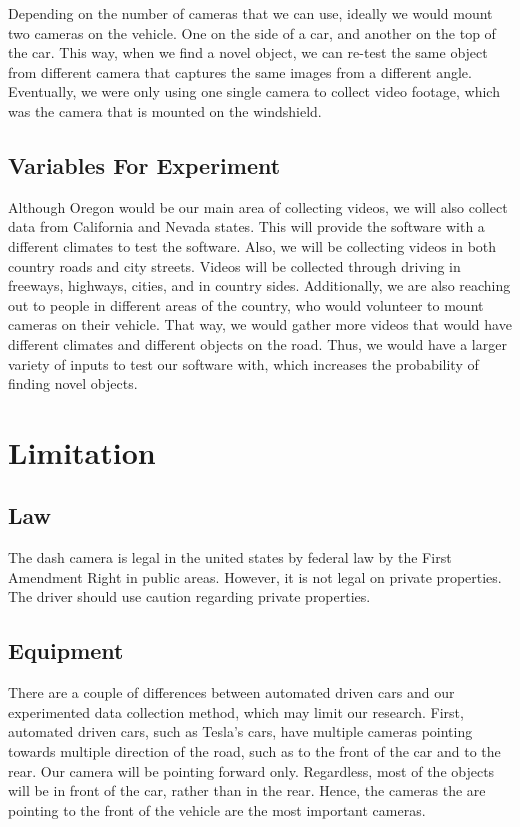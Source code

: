 \documentclass[10pt,draftclsnofoot,onecolumn,journal,compsoc]{IEEEtran}
\begin{document}
Depending on the number of cameras that we can use, ideally we would mount two cameras on the vehicle. One on the side of a car, and another on the top of the car. This way, when we find a novel object, we can re-test the same object from different camera that captures the same images from a different angle.\\

Eventually, we were only using one single camera to collect video footage, which was the camera that is mounted on the windshield. 


\subsection{Variables For Experiment}
Although Oregon would be our main area of collecting videos, we will also collect data from California and Nevada states. This will provide the software with a different climates to test the software. Also, we will be collecting videos in both country roads and city streets. Videos will be collected through driving in freeways, highways, cities, and in country sides. Additionally, we are also reaching out to people in different areas of the country, who would volunteer to mount cameras on their vehicle. That way, we would gather more videos that would have different climates and different objects on the road. Thus, we would have a larger variety of inputs to test our software with, which increases the probability of finding novel objects.


\section{Limitation}

\subsection{Law}
The dash camera is legal in the united states by federal law by the First Amendment Right in public areas. However, it is not legal on private properties. The driver should use caution regarding private properties.\\

\subsection{Equipment}
There are a couple of differences between automated driven cars and our experimented data collection method, which may limit our research. First, automated driven cars, such as Tesla’s cars, have multiple cameras pointing towards multiple direction of the road, such as to the front of the car and to the rear. Our camera will be pointing forward only. Regardless, most of the objects will be in front of the car, rather than in the rear. Hence, the cameras the are pointing to the front of the vehicle are the most important cameras.\\
\end{document}
